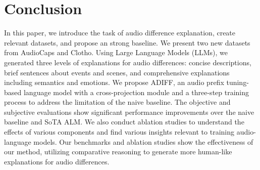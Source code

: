 \vspace{-0.1in}
\section{Conclusion} \vspace{-0.1in}
In this paper, we introduce the task of audio difference explanation, create relevant datasets, and propose an strong baseline. We present two new datasets from AudioCaps and Clotho. Using Large Language Models (LLMs), we generated three levels of explanations for audio differences: concise descriptions, brief sentences about events and scenes, and comprehensive explanations including semantics and emotions. We propose ADIFF, an audio prefix tuning-based language model with a cross-projection module and a three-step training process to address the limitation of the naive baseline. The objective and subjective evaluations show significant performance improvements over the naive baseline and SoTA ALM. We also conduct ablation studies to understand the effects of various components and find various insights relevant to training audio-language models. Our benchmarks and ablation studies show the effectiveness of our method, utilizing comparative reasoning to generate more human-like explanations for audio differences.


